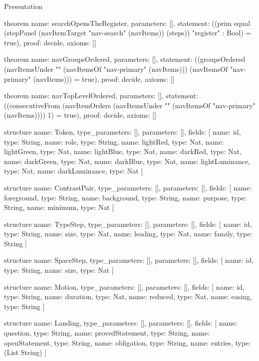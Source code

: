 \begin{lexlean}{Presentation}
\begin{semanticmodule}
theorem{
  name: searchOpensTheRegister,
  parameters: [],
  statement: ((prim equal (stepPanel (navItemTarget "nav-search" (navItems)) (steps)) "register" : Bool) = true),
  proof: decide{},
  axioms: []
}

theorem{
  name: navGroupsOrdered,
  parameters: [],
  statement: ((groupsOrdered (navItemsUnder "" (navItemsOf "nav-primary" (navItems))) (navItemsOf "nav-primary" (navItems))) = true),
  proof: decide{},
  axioms: []
}

theorem{
  name: navTopLevelOrdered,
  parameters: [],
  statement: ((consecutiveFrom (navItemOrders (navItemsUnder "" (navItemsOf "nav-primary" (navItems)))) 1) = true),
  proof: decide{},
  axioms: []
}

structure{
  name: Token,
  type_parameters: [],
  parameters: [],
  fields: [
    {name: id, type: String},
    {name: role, type: String},
    {name: lightRed, type: Nat},
    {name: lightGreen, type: Nat},
    {name: lightBlue, type: Nat},
    {name: darkRed, type: Nat},
    {name: darkGreen, type: Nat},
    {name: darkBlue, type: Nat},
    {name: lightLuminance, type: Nat},
    {name: darkLuminance, type: Nat}
  ]
}

structure{
  name: ContrastPair,
  type_parameters: [],
  parameters: [],
  fields: [
    {name: foreground, type: String},
    {name: background, type: String},
    {name: purpose, type: String},
    {name: minimum, type: Nat}
  ]
}

structure{
  name: TypeStep,
  type_parameters: [],
  parameters: [],
  fields: [
    {name: id, type: String},
    {name: size, type: Nat},
    {name: leading, type: Nat},
    {name: family, type: String}
  ]
}

structure{
  name: SpaceStep,
  type_parameters: [],
  parameters: [],
  fields: [
    {name: id, type: String},
    {name: size, type: Nat}
  ]
}

structure{
  name: Motion,
  type_parameters: [],
  parameters: [],
  fields: [
    {name: id, type: String},
    {name: duration, type: Nat},
    {name: reduced, type: Nat},
    {name: easing, type: String}
  ]
}

structure{
  name: Landing,
  type_parameters: [],
  parameters: [],
  fields: [
    {name: question, type: String},
    {name: provedStatement, type: String},
    {name: openStatement, type: String},
    {name: obligation, type: String},
    {name: entries, type: (List String)}
  ]
}


\end{semanticmodule}
\end{lexlean}
